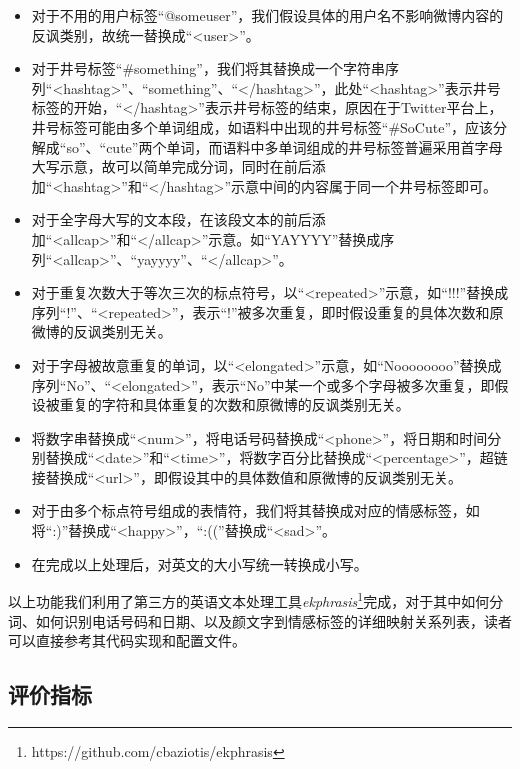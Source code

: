 \begin{itemize}

\item 对于不用的用户标签“@someuser”，我们假设具体的用户名不影响微博内容的反讽类别，故统一替换成“<user>”。

\item 对于井号标签“\#something”，我们将其替换成一个字符串序列“<hashtag>”、“something”、“</hashtag>”，此处“<hashtag>”表示井号标签的开始，“</hashtag>”表示井号标签的结束，原因在于Twitter平台上，井号标签可能由多个单词组成，如语料中出现的井号标签“\#SoCute”，应该分解成“so”、“cute”两个单词，而语料中多单词组成的井号标签普遍采用首字母大写示意，故可以简单完成分词，同时在前后添加“<hashtag>”和“</hashtag>”示意中间的内容属于同一个井号标签即可。

\item 对于全字母大写的文本段，在该段文本的前后添加“<allcap>”和“</allcap>”示意。如“YAYYYY”替换成序列“<allcap>”、“yayyyy”、“</allcap>”。

\item 对于重复次数大于等次三次的标点符号，以“<repeated>”示意，如“!!!”替换成序列“!”、“<repeated>”，表示“!”被多次重复，即时假设重复的具体次数和原微博的反讽类别无关。

\item 对于字母被故意重复的单词，以“<elongated>”示意，如“Noooooooo”替换成序列“No”、“<elongated>”，表示“No”中某一个或多个字母被多次重复，即假设被重复的字符和具体重复的次数和原微博的反讽类别无关。

\item 将数字串替换成“<num>”，将电话号码替换成“<phone>”，将日期和时间分别替换成“<date>”和“<time>”，将数字百分比替换成“<percentage>”，超链接替换成“<url>”，即假设其中的具体数值和原微博的反讽类别无关。

\item 对于由多个标点符号组成的表情符，我们将其替换成对应的情感标签，如将“:)”替换成“<happy>”，“:((”替换成“<sad>”。

\item 在完成以上处理后，对英文的大小写统一转换成小写。

\end{itemize}

以上功能我们利用了第三方的英语文本处理工具\textit{ekphrasis}\footnote{https://github.com/cbaziotis/ekphrasis}完成，对于其中如何分词、如何识别电话号码和日期、以及颜文字到情感标签的详细映射关系列表，读者可以直接参考其代码实现和配置文件。

\subsection{评价指标}

